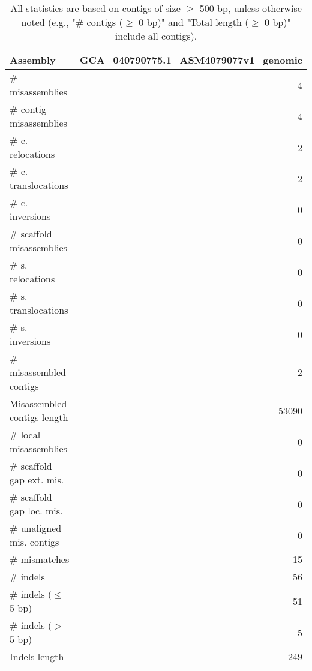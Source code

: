 \documentclass[12pt,a4paper]{article}
\begin{document}
\begin{table}[ht]
\begin{center}
\caption{All statistics are based on contigs of size $\geq$ 500 bp, unless otherwise noted (e.g., "\# contigs ($\geq$ 0 bp)" and "Total length ($\geq$ 0 bp)" include all contigs).}
\begin{tabular}{|l*{1}{|r}|}
\hline
Assembly & GCA\_040790775.1\_ASM4079077v1\_genomic \\ \hline
\# misassemblies & 4 \\ \hline
\hspace{2mm}\# contig misassemblies & 4 \\ \hline
\hspace{5mm}\# c. relocations & 2 \\ \hline
\hspace{5mm}\# c. translocations & 2 \\ \hline
\hspace{5mm}\# c. inversions & 0 \\ \hline
\hspace{2mm}\# scaffold misassemblies & 0 \\ \hline
\hspace{5mm}\# s. relocations & 0 \\ \hline
\hspace{5mm}\# s. translocations & 0 \\ \hline
\hspace{5mm}\# s. inversions & 0 \\ \hline
\# misassembled contigs & 2 \\ \hline
Misassembled contigs length & 53090 \\ \hline
\# local misassemblies & 0 \\ \hline
\# scaffold gap ext. mis. & 0 \\ \hline
\# scaffold gap loc. mis. & 0 \\ \hline
\# unaligned mis. contigs & 0 \\ \hline
\# mismatches & 15 \\ \hline
\# indels & 56 \\ \hline
\hspace{5mm}\# indels ($\leq$ 5 bp) & 51 \\ \hline
\hspace{5mm}\# indels ($>$ 5 bp) & 5 \\ \hline
Indels length & 249 \\ \hline
\end{tabular}
\end{center}
\end{table}
\end{document}
